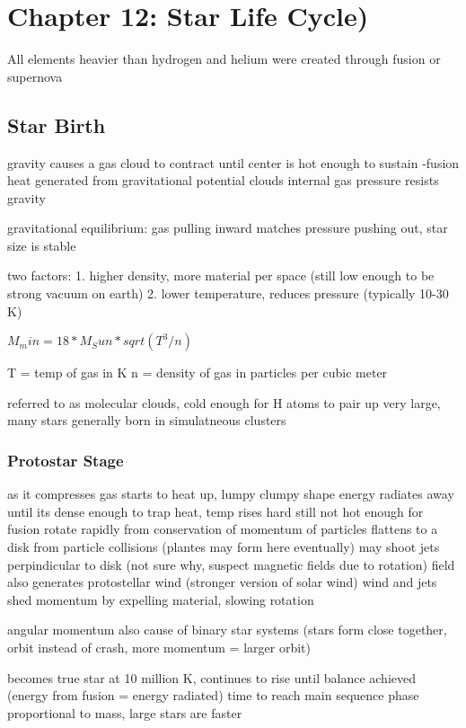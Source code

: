 \section{Chapter 12: Star Life Cycle)}
All elements heavier than hydrogen and helium were created through fusion or supernova

\subsection{Star Birth}
gravity causes a gas cloud to contract until center is hot enough to sustain -fusion
heat generated from gravitational potential
clouds internal gas pressure resists gravity

gravitational equilibrium: gas pulling inward matches pressure pushing out, star size is stable

two factors:
    1. higher density, more material per space (still low enough to be strong vacuum on earth)
    2. lower temperature, reduces pressure (typically 10-30 K)

$M_min = 18 * M_Sun * sqrt(T^3 / n)$

T = temp of gas in K
n = density of gas in particles per cubic meter

referred to as molecular clouds, cold enough for H atoms to pair up
very large, many stars generally born in simulatneous clusters


\subsubsection{Protostar Stage}
    as it compresses gas starts to heat up, lumpy clumpy shape
    energy radiates away until its dense enough to trap heat, temp rises hard
    still not hot enough for fusion
    rotate rapidly from conservation of momentum of particles
    flattens to a disk from particle collisions (plantes may form here eventually)
    may shoot jets perpindicular to disk (not sure why, suspect magnetic fields due to rotation)
    field also generates protostellar wind (stronger version of solar wind)
    wind and jets shed momentum by expelling material, slowing rotation

    angular momentum also cause of binary star systems (stars form close together, orbit instead of crash, more momentum = larger orbit)

    becomes true star at 10 million K, continues to rise until balance achieved (energy from fusion = energy radiated)
    time to reach main sequence phase proportional to mass, large stars are faster

